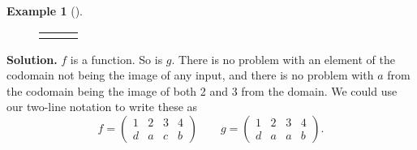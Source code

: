 \documentclass[10pt,]{book}
\theoremstyle{plain}
\theoremstyle{definition}
\newtheorem{example}[theorem]{Example}
\theoremstyle{definition}
\theoremstyle{definition}
\numberwithin{equation}{section}
\newlength{\panelmax}
\newcommand{\amp}{ & }
\begin{document}
\begin{example}[]
{{{{}
}}
\newlength{\phRimage}\setlength{\phRimage}{\ht\panelboxRimage+\dp\panelboxRimage}
\settototalheight{\phRimage}{\usebox{\panelboxRimage}}
\setlength{\panelmax}{\maxof{\panelmax}{\phRimage}}
\leavevmode%
\setlength{\tabcolsep}{0.0166666666666667\textwidth}
\begin{figure}
\hspace*{0.0166666666666667\textwidth}%
\begin{tabular}{@{}*{3}{c}@{}}
\begin{minipage}[c][\panelmax][t]{0.3\textwidth}\usebox{\panelboxPimage}\end{minipage}&
\begin{minipage}[c][\panelmax][t]{0.3\textwidth}\usebox{\panelboxQimage}\end{minipage}&
\begin{minipage}[c][\panelmax][t]{0.3\textwidth}\usebox{\panelboxRimage}\end{minipage}\end{tabular}
\end{figure}
}%
\par\medskip\noindent%
\textbf{Solution.}\quad 
          \(f\) is a function. So is \(g\). There is no problem with an element of the codomain not being the image of any input, and there is no problem with \(a\) from the codomain being the image of both 2 and 3 from the domain. We could use our two-line notation to write these as
          \begin{equation*}
            f= \begin{pmatrix} 1 \amp 2 \amp 3 \amp 4 \\ d \amp a \amp c \amp b \end{pmatrix} \qquad g = \begin{pmatrix} 1 \amp 2 \amp 3 \amp 4 \\ d \amp a \amp a \amp b \end{pmatrix}.
          \end{equation*}

\par


\end{example}
\end{document}
